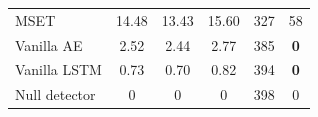 \begin{table}[H]
\begin{tabular}{l *3{S[table-format=3.2]} *2{S[table-format=3.0]}}
        MSET                         & 14.48          & 13.43          & 15.60          & 327          & 58         \\
        Vanilla AE                   & 2.52           & 2.44           & 2.77           & 385          & \textbf{0} \\
        Vanilla LSTM                 & 0.73           & 0.70           & 0.82           & 394          & \textbf{0} \\
        \midrule
        Null detector                & 0              & 0              & 0              & 398          & 0          \\
        \bottomrule
    \end{tabular}
\end{table}
